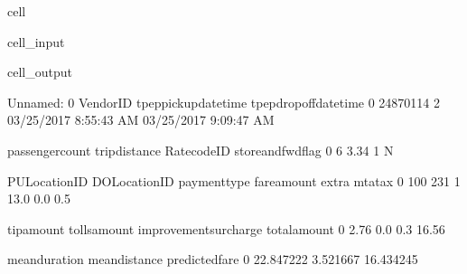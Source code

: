 \documentclass[letterpaper,10pt,english]{sphinxmanual}
\begin{document}
\begin{sphinxuseclass}{cell}
\begin{sphinxuseclass}{cell_input}
\begin{sphinxVerbatim}[commandchars=\\\{\}]
\end{sphinxVerbatim}

\end{sphinxuseclass}
\begin{sphinxuseclass}{cell_output}
\begin{sphinxVerbatim}[commandchars=\\\{\}]
   Unnamed: 0  VendorID   tpep\PYGZus{}pickup\PYGZus{}datetime  tpep\PYGZus{}dropoff\PYGZus{}datetime  \PYGZbs{}
0    24870114         2  03/25/2017 8:55:43 AM  03/25/2017 9:09:47 AM   

   passenger\PYGZus{}count  trip\PYGZus{}distance  RatecodeID store\PYGZus{}and\PYGZus{}fwd\PYGZus{}flag  \PYGZbs{}
0                6           3.34           1                  N   

   PULocationID  DOLocationID  payment\PYGZus{}type  fare\PYGZus{}amount  extra  mta\PYGZus{}tax  \PYGZbs{}
0           100           231             1         13.0    0.0      0.5   

   tip\PYGZus{}amount  tolls\PYGZus{}amount  improvement\PYGZus{}surcharge  total\PYGZus{}amount  \PYGZbs{}
0        2.76           0.0                    0.3         16.56   

   mean\PYGZus{}duration  mean\PYGZus{}distance  predicted\PYGZus{}fare  
0      22.847222       3.521667       16.434245  
\end{sphinxVerbatim}

\end{sphinxuseclass}
\end{sphinxuseclass}
\end{document}
